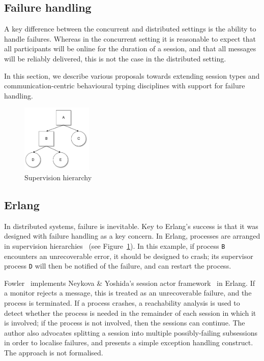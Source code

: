 \documentclass[
graybox,
envcountchap
]{svmult}
\begin{document}
\begin{bibunit}
  \section{Failure handling}\label{sec:bt:failure-handling}

  A key difference between the concurrent and distributed settings is the
  ability to handle failures. Whereas in the concurrent setting it is reasonable
  to expect that all participants will be online for the duration of a session,
  and that all messages will be reliably delivered, this is not the case in the
  distributed setting.

  In this section, we describe various proposals towards extending session types
  and communication-centric behavioural typing disciplines with support for
  failure handling.

  \begin{figure}[t]
    \centering
    \includegraphics[width=0.3\textwidth]{img/SupervisionTree.pdf}
    \caption{Supervision hierarchy}
    \label{fig:bt:supervision}
  \end{figure}

  \subsection{Erlang}
  In distributed systems, failure is inevitable. Key to Erlang's success is that
  it was  designed with failure handling as a key concern. In Erlang, processes
  are arranged in supervision hierarchies~\cite{Armstrong03:thesis} (see
  Figure~\ref{fig:bt:supervision}). In this example, if process \texttt{B}
  encounters an unrecoverable error, it should be designed to crash; its
  supervisor process \texttt{D} will then be notified of the failure, and can
  restart the process.

  Fowler~\cite{Fowler16:actors} implements Neykova \& Yoshida's session actor
  framework~\cite{NeykovaY16:sactor} in Erlang. If a monitor rejects a message,
  this is treated as an unrecoverable failure, and the process is terminated.
  If a process crashes, a reachability analysis is used to detect whether the
  process is needed in the remainder of each session in which it is involved; if
  the process is not involved, then the sessions can continue. The author also
  advocates splitting a session into multiple possibly-failing subsessions in
  order to localise failures, and presents a simple exception handling
  construct. The approach is not formalised.


\end{bibunit}
\end{document}
